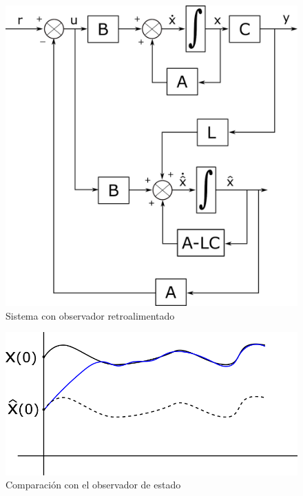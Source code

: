\begin{figure}[ht]
    \centering
        \includegraphics[scale=0.17]{Control de Sistemas Mecatronicos Figuras/11 Sistema con Observador Retroalimentado.png}
        \caption{Sistema con observador retroalimentado}
\end{figure}

\begin{figure}[h!]
    \centering
        \includegraphics[scale=0.20]{Control de Sistemas Mecatronicos Figuras/12 Comparacion con Observador.png}
        \caption{Comparación con el observador de estado}
\end{figure}

